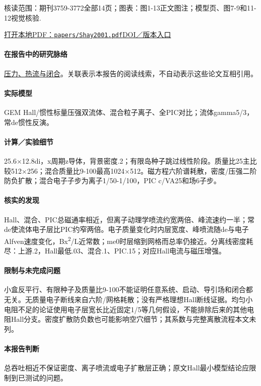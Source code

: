 \documentclass[UTF8,a4paper,11pt,openany,fontset=fandol]{ctexbook}
\begin{document}
\textsf{核读范围：}期刊3759-3772全部14页；\textsf{图表：}图1-13正文图注；模型页、图7-9和11-12视觉核验.

\href{run:../papers/Shay2001.pdf}{打开本地PDF：\texttt{papers/Shay2001.pdf}}\quad\href{https://doi.org/10.1029/1999ja001007}{DOI／版本入口}

\paragraph{在报告中的研究脉络}\hyperref[story:closure]{压力、热流与闭合}。关联表示本报告的阅读线索，不自动表示这些论文互相引用。

\paragraph{实际模型}GEM Hall/惯性标量压强双流体、混合粒子离子、全PIC对比；流体gamma5/3，常de惯性反演。

\paragraph{计算／实验细节}25.6×12.8di，x周期z导体，背景密度.2；有限岛种子跳过线性阶段。质量比25主比较512×256；混合质量比9-100最高1024×512。磁方程六阶谱耗散，密度/压强二阶防负扩散；混合电子子步为离子1/50-1/100，PIC c/VA25和场6子步。

\paragraph{核实的发现}Hall、混合、PIC总磁通率相近，但离子动理学喷流约宽两倍、峰流速约一半；常de使流体电子层比PIC约窄两倍。电子质量变化时内层宽度、峰喷流随de与电子Alfven速度变化，Bx\textsuperscript{2}/L近常数；me0时层缩到网格而总率仍接近。分离线密度耗尽：上游.2，Hall最低.03、混合.1、PIC.15；对应Hall电流与磁压增强。

\paragraph{限制与未完成问题}小盒反平行、有限种子及质量比9-100不能证明任意系统、启动、导引场和闭合都无关。无质量电子断线来自六阶/网格耗散；没有严格理想Hall断线证据。均匀小电阻不足的论证使用电子层宽长比近固定1/5等几何假设，不能排除后来的其他电阻Hall分支。密度扩散防负数也可能影响空穴细节；其系数与完整离散流程本文未列。

\paragraph{本报告判断}总吞吐相近不保证密度、离子喷流或电子扩散层正确；原文Hall最小模型结论应限制到已测试的问题。
\end{document}
